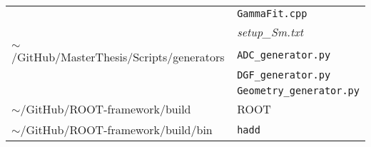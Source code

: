 \begin{tabular}{ll}
                                                           & \texttt{GammaFit.cpp}                   \\
                                                           & \textit{setup\_Sm.txt}                  \\
    $\sim$/GitHub/MasterThesis/Scripts/generators          & \texttt{ADC\_generator.py}              \\
                                                           & \texttt{DGF\_generator.py}              \\
                                                           & \texttt{Geometry\_generator.py}         \\
    $\sim$/GitHub/ROOT-framework/build                     & ROOT                                    \\
    $\sim$/GitHub/ROOT-framework/build/bin                 & \texttt{hadd}                           \\
    \hline
\end{tabular}